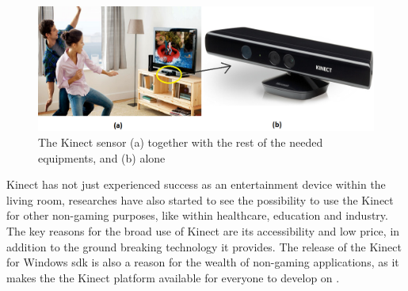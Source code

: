 \begin{figure} 
\centering
\includegraphics[scale=0.36]{sensorandtv}
\caption[The Kinect sensor]{The Kinect sensor (a) together with the rest of the needed equipments, and (b) alone}
\label{kinectsensor}
\end{figure} 
 
Kinect has not just experienced success as an entertainment device within the living room, researches have also started to see the possibility to use the Kinect for other non-gaming purposes, like within healthcare, education and industry. The key reasons for the broad use of Kinect are its accessibility and low price, in addition to the ground breaking technology it provides. The release of the Kinect for Windows \ac{sdk} is also a reason for the wealth of non-gaming applications, as it makes the the Kinect platform available for everyone to develop on \cite{microsoftnews}. 

